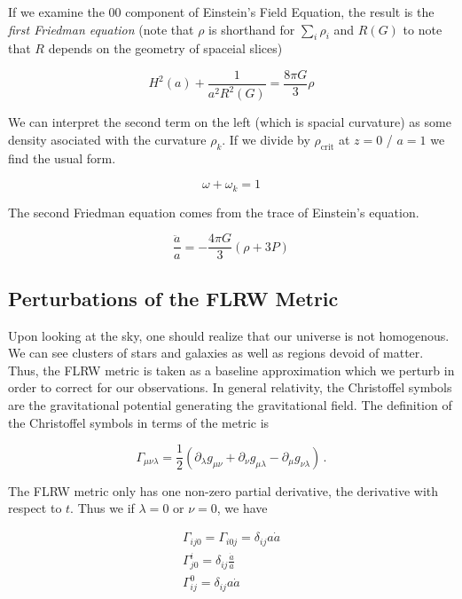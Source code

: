 If we examine the $00$ component of Einstein's Field Equation, the result is the \textit{first Friedman equation} (note that $\rho$ is shorthand for $\sum_i\rho_i$ and $R(G)$ to note that $R$ depends on the geometry of spaceial slices)

\begin{equation}
    H^2(a) + \frac{1}{a^2 R^2(G)} = \frac{8\pi G}{3}\rho
\end{equation}

We can interpret the second term on the left (which is spacial curvature) as some density asociated with the curvature $\rho_k$. If we divide by $\rho_{\text{crit}}$ at $z=0$ / $a=1$ we find the usual form. 

\begin{equation}
    \omega + \omega_k = 1 
\end{equation}

The second Friedman equation comes from the trace of Einstein's equation.

\begin{equation}
    \frac{\ddot a}{a} = -\frac{4\pi G}{3}(\rho + 3P)
\end{equation}

\subsection{Perturbations of the FLRW Metric}
Upon looking at the sky, one should realize that our universe is not homogenous. We can see clusters of stars and galaxies as well as regions devoid of matter. Thus, the FLRW metric is taken as a baseline approximation which we perturb in order to correct for our observations. In general relativity, the Christoffel symbols are the gravitational potential generating the gravitational field. The definition of the Christoffel symbols in terms of the metric is

\begin{equation}
	\Gamma_{\mu\nu\lambda} = \frac{1}{2} 
	\left(
		\partial_\lambda g_{\mu\nu} + \partial_{\nu} g_{\mu\lambda} - \partial_{\mu}g_{\nu\lambda} 
	\right)\,.
\end{equation}

The FLRW metric only has one non-zero partial derivative, the derivative with respect to $t$. Thus we if $\lambda=0$ or $\nu=0$, we have

\begin{equation}
	\begin{split}
		\Gamma_{ij0} = \Gamma_{i0j} = \delta_{ij}a \dot a \\
		\Gamma_{j0}^i = \delta_{ij} \frac{\dot a}{a} \\
		\Gamma_{ij}^0 = \delta_{ij} a \dot a
	\end{split}
\end{equation}

